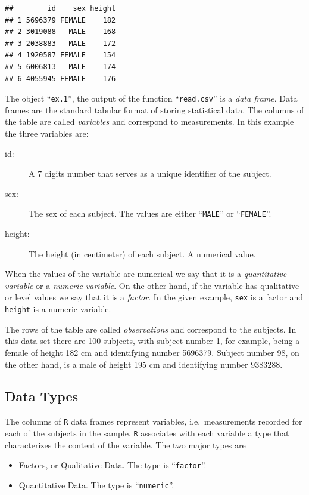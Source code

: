 \documentclass[
]{krantz}
\theoremstyle{definition}
\theoremstyle{definition}
\theoremstyle{definition}
\theoremstyle{remark}
\begin{document}
\begin{verbatim}
##        id    sex height
## 1 5696379 FEMALE    182
## 2 3019088   MALE    168
## 3 2038883   MALE    172
## 4 1920587 FEMALE    154
## 5 6006813   MALE    174
## 6 4055945 FEMALE    176
\end{verbatim}

The object ``\texttt{ex.1}'', the output of the function ``\texttt{read.csv}'' is a \emph{data frame}. Data frames are the standard tabular format of storing statistical data. The columns of the table are called \emph{variables} and correspond to measurements. In this example the three variables are:

\begin{description}
\item[id:]
A 7 digits number that serves as a unique identifier of the subject.
\item[sex:]
The sex of each subject. The values are either ``\texttt{MALE}'' or ``\texttt{FEMALE}''.
\item[height:]
The height (in centimeter) of each subject. A numerical value.
\end{description}

When the values of the variable are numerical we say that it is a \emph{quantitative variable} or a \emph{numeric variable}. On the other hand, if the variable has qualitative or level values we say that it is a \emph{factor}. In the given example, \texttt{sex} is a factor and \texttt{height} is a numeric variable.

The rows of the table are called \emph{observations} and correspond to the subjects. In this data set there are 100 subjects, with subject number 1, for example, being a female of height 182 cm and identifying number 5696379. Subject number 98, on the other hand, is a male of height 195 cm and identifying number 9383288.

\hypertarget{data-types}{%
\subsection{Data Types}\label{data-types}}

The columns of \texttt{R} data frames represent variables, i.e.~measurements recorded for each of the subjects in the sample. \texttt{R} associates with each variable a type that characterizes the content of the variable. The two major types are

\begin{itemize}
\item
  Factors, or Qualitative Data. The type is ``\texttt{factor}''.
\item
  Quantitative Data. The type is ``\texttt{numeric}''.
\end{itemize}
\end{document}
